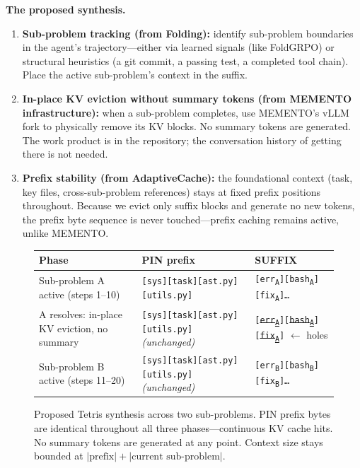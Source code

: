 \documentclass[letterpaper,twocolumn,10pt]{article}
\newcommand{\sysname}{AdaptiveCache}
\newcommand{\para}[1]{\smallskip\noindent\textbf{#1.}\ }
\begin{document}
\para{The proposed synthesis}
\begin{enumerate}[1.,leftmargin=1.8em,topsep=2pt,itemsep=1pt]
  \item \textbf{Sub-problem tracking (from Folding):} identify sub-problem
    boundaries in the agent's trajectory---either via learned signals (like
    FoldGRPO) or structural heuristics (a git commit, a passing test, a
    completed tool chain). Place the active sub-problem's context in the
    suffix.
  \item \textbf{In-place KV eviction without summary tokens (from MEMENTO
    infrastructure):} when a sub-problem completes, use MEMENTO's vLLM fork
    to physically remove its KV blocks. No summary tokens are generated. The
    work product is in the repository; the conversation history of getting
    there is not needed.
  \item \textbf{Prefix stability (from \sysname):} the foundational context
    (task, key files, cross-sub-problem references) stays at fixed prefix
    positions throughout. Because we evict only suffix blocks and generate
    no new tokens, the prefix byte sequence is never touched---prefix caching
    remains active, unlike MEMENTO.
\end{enumerate}

\begin{figure}[t]
\centering
\small
\setlength{\tabcolsep}{5pt}
\begin{tabular}{lll}
\toprule
\textbf{Phase} & \textbf{PIN prefix} & \textbf{SUFFIX} \\
\midrule
Sub-problem A active (steps 1--10)
  & \texttt{[sys][task][ast.py][utils.py]}
  & \texttt{[err\textsubscript{A}][bash\textsubscript{A}][fix\textsubscript{A}]\ldots} \\
A resolves: in-place KV eviction, no summary
  & \texttt{[sys][task][ast.py][utils.py]} \quad\textit{(unchanged)}
  & \texttt{[\sout{err\textsubscript{A}}][\sout{bash\textsubscript{A}}][\sout{fix\textsubscript{A}}]} $\leftarrow$ holes \\
Sub-problem B active (steps 11--20)
  & \texttt{[sys][task][ast.py][utils.py]} \quad\textit{(unchanged)}
  & \texttt{[err\textsubscript{B}][bash\textsubscript{B}][fix\textsubscript{B}]\ldots} \\
\bottomrule
\end{tabular}
\caption{Proposed Tetris synthesis across two sub-problems. PIN prefix bytes are
identical throughout all three phases---continuous KV cache hits. No summary tokens
are generated at any point. Context size stays bounded at
$|\text{prefix}| + |\text{current sub-problem}|$.}
\label{fig:tetris}
\end{figure}
\end{document}
